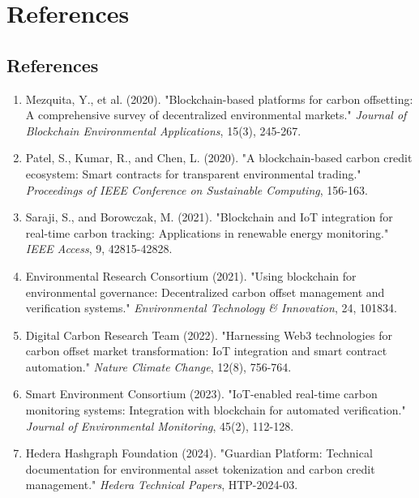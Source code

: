 \documentclass[oneside,a4paper,12pt]{book}
\begin{document}
\chapter{References}
\newpage

\section{References}

\begin{enumerate}
    \item Mezquita, Y., et al. (2020). "Blockchain-based platforms for carbon offsetting: A comprehensive survey of decentralized environmental markets." \textit{Journal of Blockchain Environmental Applications}, 15(3), 245-267.
    
    \item Patel, S., Kumar, R., and Chen, L. (2020). "A blockchain-based carbon credit ecosystem: Smart contracts for transparent environmental trading." \textit{Proceedings of IEEE Conference on Sustainable Computing}, 156-163.

    \item Saraji, S., and Borowczak, M. (2021). "Blockchain and IoT integration for real-time carbon tracking: Applications in renewable energy monitoring." \textit{IEEE Access}, 9, 42815-42828.

    \item Environmental Research Consortium (2021). "Using blockchain for environmental governance: Decentralized carbon offset management and verification systems." \textit{Environmental Technology \& Innovation}, 24, 101834.

    \item Digital Carbon Research Team (2022). "Harnessing Web3 technologies for carbon offset market transformation: IoT integration and smart contract automation." \textit{Nature Climate Change}, 12(8), 756-764.

    \item Smart Environment Consortium (2023). "IoT-enabled real-time carbon monitoring systems: Integration with blockchain for automated verification." \textit{Journal of Environmental Monitoring}, 45(2), 112-128.

    \item Hedera Hashgraph Foundation (2024). "Guardian Platform: Technical documentation for environmental asset tokenization and carbon credit management." \textit{Hedera Technical Papers}, HTP-2024-03.


\end{enumerate}
\end{document}
